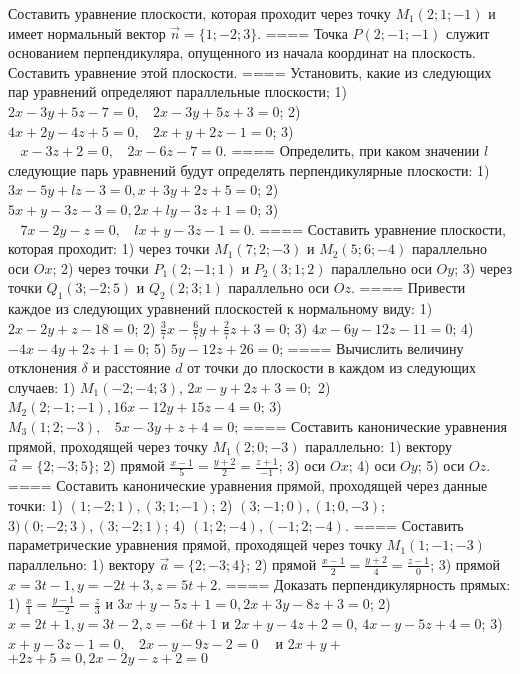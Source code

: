 Составить уравнение плоскости, которая проходит через точку \(M_{1}(2;1; - 1)\) и имеет нормальный вектор \(\overrightarrow{n} = \{ 1; - 2;3\}\).
====
Точка \(P(2; - 1; - 1)\) служит основанием перпендикуляра, опущенного из начала координат на плоскость. Составить уравнение этой плоскости.
====
Установить, какие из следующих пар уравнений определяют параллельные плоскости; 1) \(2x - 3y + 5z - 7 = 0,\ \ \ \ 2x - 3y + 5z + 3 = 0\); 2) \(4x + 2y - 4z + 5 = 0,\ \ \ \ 2x + y + 2z - 1 = 0\); 3) \(\ \ \ \ x - 3z + 2 = 0,\ \ \ \ 2x - 6z - 7 = 0\).
====
Определить, при каком значении \(l\) следующие парь уравнений будут определять перпендикулярные плоскости: 1) \(3x - 5y + lz - 3 = 0,x + 3y + 2z + 5 = 0\); 2) \(5x + y - 3z - 3 = 0,2x + ly - 3z + 1 = 0\); 3) \(\ \ \ \ 7x - 2y - z = 0,\ \ \ \ lx + y - 3z - 1 = 0\).
====
Составить уравнение плоскости, которая проходит: 1) через точки \(M_{1}(7;2; - 3)\) и \(M_{2}(5;6; - 4)\) параллельно оси \(Ox\); 2) через точки \(P_{1}(2; - 1;1)\) и \(P_{2}(3;1;2)\) параллельно оси \(Oy\); 3) через точки \(Q_{1}(3; - 2;5)\) и \(Q_{2}(2;3;1)\) параллельно оси \(Oz\).
====
Привести каждое из следующих уравнений плоскостей к нормальному виду: 1) \(2x - 2y + z - 18 = 0\); 2) \(\frac{3}{7}x - \frac{6}{7}y + \frac{2}{7}z + 3 = 0\); 3) \(4x - 6y - 12z - 11 = 0\); 4) \(- 4x - 4y + 2z + 1 = 0\); 5) \(5y - 12z + 26 = 0\);
====
Вычислить величину отклонения \(\delta\) и расстояние \(d\) от точки до плоскости в каждом из следующих случаев: 1) \(M_{1}( - 2; - 4;3)\), \(2x - y + 2z + 3 = 0;\) 2) \(M_{2}(2; - 1; - 1),16x - 12y + 15z - 4 = 0\); 3) \(M_{3}(1;2; - 3),\ \ \ \ 5x - 3y + z + 4 = 0\);
====
Составить канонические уравнения прямой, проходящей через точку \(M_{1}(2;0; - 3)\) параллельно: 1) вектору \(\overrightarrow{a} = \{ 2; - 3;5\}\); 2) прямой \(\frac{x - 1}{5} = \frac{y + 2}{2} = \frac{z + 1}{- 1}\); 3) оси \(Ox\); 4) оси \(Oy\); 5) оси \(Oz\).
====
Составить канонические уравнения прямой, проходящей через данные точки: 1) \((1; - 2;1),(3;1; - 1)\); 2) \((3; - 1;0),(1;0, - 3);\) \(3)(0; - 2;3),(3; - 2;1)\); 4) \((1;2; - 4),( - 1;2; - 4)\).
====
Составить параметрические уравнения прямой, проходящей через точку \(M_{1}(1; - 1; - 3)\) параллельно: 1) вектору \(\overrightarrow{a} = \{ 2; - 3;4\}\); 2) прямой \(\frac{x - 1}{2} = \frac{y + 2}{4} = \frac{z - 1}{0}\); 3) прямой \(x = 3t - 1,y = - 2t + 3,z = 5t + 2\).
====
Доказать перпендикулярность прямых: 1) \(\frac{x}{1} = \frac{y - 1}{- 2} = \frac{z}{3}\) и \(3x + y - 5z + 1 = 0,2x + 3y - 8z + 3 = 0\); 2) \(x = 2t + 1,y = 3t - 2,z = - 6t + 1\) и \(2x + y - 4z + 2 = 0\), \(4x - y - 5z + 4 = 0\); 3) \(x + y - 3z - 1 = 0,\ \ \ \ 2x - y - 9z - 2 = 0\ \ \ \ \) и \(2x + y +\) \(+ 2z + 5 = 0,2x - 2y - z + 2 = 0\)
